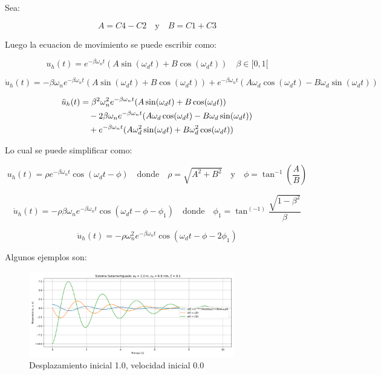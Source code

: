 \documentclass{article}  %
\begin{document}
Sea:

\begin{equation}
    A = C4 - C2 \quad \text{y} \quad B = C1 + C3
\end{equation}

Luego la ecuacion de movimiento se puede escribir como:

\begin{equation}
    u_h(t) = e^{-\beta \omega_n t} (A \sin(\omega_d t) + B \cos(\omega_d t)) \quad \beta \in [0, 1[
\end{equation}

\begin{equation}
    \dot{u}_h(t) = -\beta \omega_n e^{-\beta \omega_n t} (A \sin(\omega_d t) + B \cos(\omega_d t)) + e^{-\beta \omega_n t} (A \omega_d \cos(\omega_d t) - B \omega_d \sin(\omega_d t))
\end{equation}

\begin{align}
    \ddot{u}_h(t) &= \beta^2 \omega_n^2 e^{-\beta \omega_n t} (A \sin(\omega_d t) + B \cos(\omega_d t)) \notag \\
    &\quad - 2\beta \omega_n e^{-\beta \omega_n t} (A \omega_d \cos(\omega_d t) - B \omega_d \sin(\omega_d t)) \notag \\
    &\quad + e^{-\beta \omega_n t} (A \omega_d^2 \sin(\omega_d t) + B \omega_d^2 \cos(\omega_d t))
\end{align}
    
Lo cual se puede simplificar como:

\begin{equation}
    u_h(t) = \rho e^{-\beta \omega_n t} \cos(\omega_d t - \phi) \quad \text{donde} \quad \rho = \sqrt{A^2 + B^2} \quad \text{y} \quad \phi = \tan^{-1}(\frac{A}{B})
\end{equation}

\begin{equation}
    \dot{u}_h(t) = -\rho \beta \omega_n e^{-\beta \omega_n t} \cos(\omega_d t - \phi -\phi_1) \quad \text{donde} \quad \phi_1 = \tan^(-1)\frac{\sqrt{1-\beta^2}}{\beta}
\end{equation}

\begin{equation}
    \ddot{u}_h(t) = -\rho \omega_n^2 e^{-\beta \omega_n t} \cos(\omega_d t - \phi - 2\phi_1)
\end{equation}

Algunos ejemplos son:

\begin{figure}[H]
    \centering
    \includegraphics[width=0.8\textwidth]{GRAFICOS/sis_subamortiguado_u0_1.0_v0_0.0_zeta_0.1.png}
    \caption{Desplazamiento inicial 1.0, velocidad inicial 0.0}
    \label{fig:ejemplo1}
\end{figure}
\end{document}
